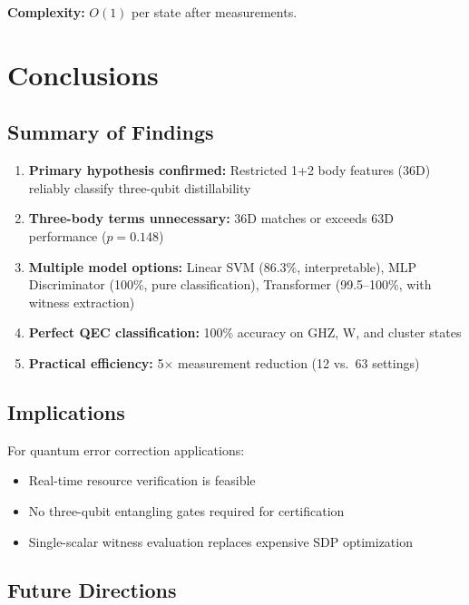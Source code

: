 \documentclass[11pt,a4paper]{article}
\begin{document}
\textbf{Complexity:} $O(1)$ per state after measurements.

\section{Conclusions}

\subsection{Summary of Findings}

\begin{enumerate}
    \item \textbf{Primary hypothesis confirmed:} Restricted 1+2 body features (36D) reliably classify three-qubit distillability
    \item \textbf{Three-body terms unnecessary:} 36D matches or exceeds 63D performance ($p = 0.148$)
    \item \textbf{Multiple model options:} Linear SVM (86.3\%, interpretable), MLP Discriminator (100\%, pure classification), Transformer (99.5--100\%, with witness extraction)
    \item \textbf{Perfect QEC classification:} 100\% accuracy on GHZ, W, and cluster states
    \item \textbf{Practical efficiency:} 5$\times$ measurement reduction (12 vs.\ 63 settings)
\end{enumerate}

\subsection{Implications}

For quantum error correction applications:
\begin{itemize}[noitemsep]
    \item Real-time resource verification is feasible
    \item No three-qubit entangling gates required for certification
    \item Single-scalar witness evaluation replaces expensive SDP optimization
\end{itemize}

\subsection{Future Directions}
\end{document}
